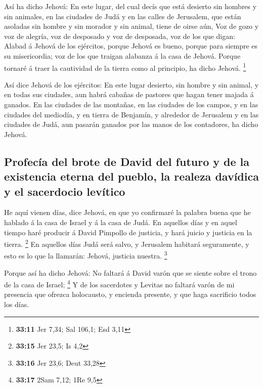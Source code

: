  Así ha dicho Jehová: En este lugar, del cual decís que
está desierto sin hombres y sin animales, en las ciudades de Judá y en
las calles de Jerusalem, que están asoladas sin hombre y sin morador y
sin animal, tiene de oirse aún,  Voz de gozo y voz de
alegría, voz de desposado y voz de desposada, voz de los que digan:
Alabad á Jehová de los ejércitos, porque Jehová es bueno, porque para
siempre es su misericordia; voz de los que traigan alabanza á la casa de
Jehová. Porque tornaré á traer la cautividad de la tierra como al
principio, ha dicho Jehová. \footnote{\textbf{33:11} Jer 7,34; Sal
  106,1; Esd 3,11}

 Así dice Jehová de los ejércitos: En este lugar desierto,
sin hombre y sin animal, y en todas sus ciudades, aun habrá cabañas de
pastores que hagan tener majada á ganados.  En las ciudades
de las montañas, en las ciudades de los campos, y en las ciudades del
mediodía, y en tierra de Benjamín, y alrededor de Jerusalem y en las
ciudades de Judá, aun pasarán ganados por las manos de los contadores,
ha dicho Jehová.

\hypertarget{profecuxeda-del-brote-de-david-del-futuro-y-de-la-existencia-eterna-del-pueblo-la-realeza-davuxeddica-y-el-sacerdocio-levuxedtico}{%
\subsection{Profecía del brote de David del futuro y de la existencia
eterna del pueblo, la realeza davídica y el sacerdocio
levítico}\label{profecuxeda-del-brote-de-david-del-futuro-y-de-la-existencia-eterna-del-pueblo-la-realeza-davuxeddica-y-el-sacerdocio-levuxedtico}}

 He aquí vienen días, dice Jehová, en que yo confirmaré la
palabra buena que he hablado á la casa de Israel y á la casa de Judá.
 En aquellos días y en aquel tiempo haré producir á David
Pimpollo de justicia, y hará juicio y justicia en la tierra. \footnote{\textbf{33:15}
  Jer 23,5; Is 4,2}  En aquellos días Judá será salvo, y
Jerusalem habitará seguramente, y esto es lo que la llamarán: Jehová,
justicia nuestra. \footnote{\textbf{33:16} Jer 23,6; Deut 33,28}

 Porque así ha dicho Jehová: No faltará á David varón que
se siente sobre el trono de la casa de Israel; \footnote{\textbf{33:17}
  2Sam 7,12; 1Re 9,5}  Y de los sacerdotes y Levitas no
faltará varón de mi presencia que ofrezca holocausto, y encienda
presente, y que haga sacrificio todos los días.


